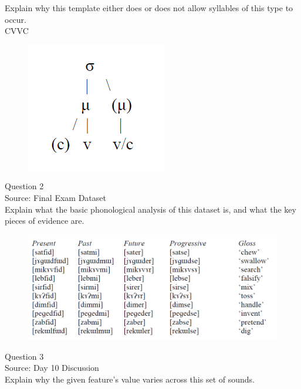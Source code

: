 \documentclass[12pt]{article}
\begin{document}
Explain why this template either does or does not allow syllables of this type to occur.\\

CVVC

\begin{figure}[H]
\includegraphics{../images/ponapean_syllabletemplate.png}
\end{figure}

\newpage

{\large Question 2}\\

Source: Final Exam Dataset\\

Explain what the basic phonological analysis of this dataset is, and what the key pieces of evidence are.\\

\begin{figure}[H]
\includegraphics{../images/final_dataset.png}
\end{figure}

\newpage

{\large Question 3}\\

Source: Day 10 Discussion\\

Explain why the given feature's value varies across this set of sounds.\\
\end{document}
